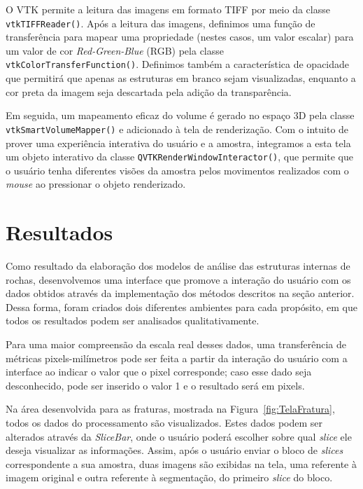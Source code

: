 \documentclass[a4paper,10pt,twocolumn,twoside]{article}
\begin{document}
O VTK permite a leitura das imagens em formato TIFF por meio da classe \texttt{vtkTIFFReader()}. Após a leitura das imagens, definimos uma função de transferência para mapear uma propriedade (nestes casos, um valor escalar) para um valor de cor {\it Red-Green-Blue} (RGB) pela classe \texttt{vtkColorTransferFunction()}. Definimos também a característica de opacidade que permitirá que apenas as estruturas em branco sejam visualizadas, enquanto a cor preta da imagem seja descartada pela adição da transparência.

Em seguida, um mapeamento eficaz do volume é gerado no espaço 3D pela classe \texttt{vtkSmartVolumeMapper()} e adicionado à tela de renderização. Com o intuito de prover uma experiência interativa do usuário e a amostra, integramos a esta tela um objeto interativo da classe \texttt{QVTKRenderWindowInteractor()}, que permite que o usuário tenha diferentes visões da amostra pelos movimentos realizados com o {\it mouse} ao pressionar o objeto renderizado.

\section{Resultados}
\label{sec:resultados}

Como resultado da elaboração dos modelos de análise das estruturas internas de rochas, desenvolvemos uma interface que promove a interação do usuário com os dados obtidos através da implementação dos métodos descritos na seção anterior. Dessa forma, foram criados dois diferentes ambientes para cada propósito, em que todos os resultados podem ser analisados qualitativamente.

Para uma maior compreensão da escala real desses dados, uma transferência de métricas pixels-milímetros pode ser feita a partir da interação do usuário com a interface ao indicar o valor que o pixel corresponde; caso esse dado seja desconhecido, pode ser inserido o valor 1 e o resultado será em pixels.

Na área desenvolvida para as fraturas, mostrada na Figura~\ref{fig:TelaFratura}, todos os dados do processamento são visualizados. Estes dados podem ser alterados através da \textit{SliceBar}, onde o usuário poderá escolher sobre qual \textit{slice} ele deseja visualizar as informações. Assim, após o usuário enviar o bloco de \textit{slices} correspondente a sua amostra, duas imagens são exibidas na tela, uma referente à imagem original e outra referente à segmentação, do primeiro \textit{slice} do bloco.
\end{document}
